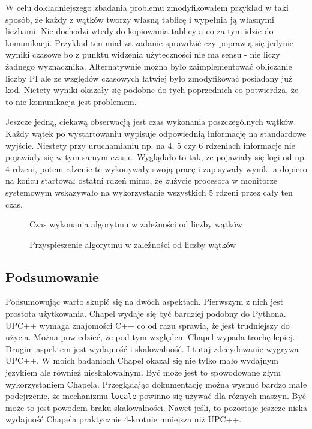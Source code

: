 W celu dokładniejszego zbadania problemu zmodyfikowałem przykład w taki sposób,
że każdy z wątków tworzy własną tablicę i wypełnia ją własnymi liczbami.
Nie dochodzi wtedy do kopiowania tablicy a co za tym idzie do komunikacji.
Przykład ten miał za zadanie sprawdzić czy poprawią się jedynie wyniki czasowe bo
z punktu widzenia użyteczności nie ma sensu - nie liczy żadnego wyznacznika.
Alternatywnie można było zaimplementować obliczanie liczby PI ale ze względów czasowych
łatwiej było zmodyfikować posiadany już kod.
Nietety wyniki okazały się podobne do tych poprzednich co potwierdza, że to nie komunikacja
jest problemem.

Jeszcze jedną, ciekawą obserwacją jest czas wykonania poszczególnych wątków.
Każdy wątek po wystartowaniu wypisuje odpowiednią informację na standardowe wyjście.
Niestety przy uruchamianiu np. na 4, 5 czy 6 rdzeniach informacje nie pojawiały się w tym
samym czasie.
Wyglądało to tak, że pojawiały się logi od np. 4 rdzeni, potem rdzenie te wykonywały swoją
pracę i zapisywały wyniki a dopiero na końcu startował ostatni rdzeń mimo, że zużycie
procesora w monitorze systemowym wskazywało na wykorzystanie wszystkich
5 rdzeni przez cały ten czas.

\begin{figure}
    \centering
    
    \caption{Czas wykonania algorytmu w zależności od liczby wątków}
    \label{fig:chapel-matrixdet-time}
\end{figure}

\begin{figure}
    \centering
    
    \caption{Przyspieszenie algorytmu w zależności od liczby wątków}
    \label{fig:chapel-matrixdet-speedup}
\end{figure}

\subsection{Podsumowanie}
Podsumowując warto skupić się na dwóch aspektach.
Pierwszym z nich jest prostota użytkowania.
Chapel wydaje się być bardziej podobny do Pythona.
UPC++ wymaga znajomości C++ co od razu sprawia, że jest trudniejszy do użycia.
Można powiedzieć, że pod tym względem Chapel wypada trochę lepiej.
Drugim aspektem jest wydajność i skalowalność.
I tutaj zdecydowanie wygrywa UPC++.
W moich badaniach Chapel okazał się nie tylko mało wydajnym językiem ale również
nieskalowalnym.
Być może jest to spowodowane złym wykorzystaniem Chapela.
Przeglądając dokumentację można wysnuć bardzo małe podejrzenie, że mechanizmu
\texttt{locale} powinno się używać dla różnych maszyn.
Być może to jest powodem braku skalowalności.
Nawet jeśli, to pozostaje jeszcze niska wydajność Chapela praktycznie
4-krotnie mniejsza niż UPC++.